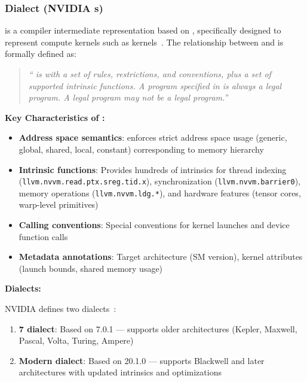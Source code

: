 \subsubsection{  Dialect (NVIDIA s)}

  is a compiler intermediate representation based on  , specifically designed to represent  compute kernels such as  kernels~\cite{nvvmirspec}. The relationship between   and   is formally defined as:

\begin{quote}
\textit{``  is   with a set of rules, restrictions, and conventions, plus a set of supported intrinsic functions. A program specified in   is always a legal  program. A legal  program may not be a legal  program.''}~\cite{nvvmirspec}
\end{quote}

\textbf{Key Characteristics of  :}

\begin{itemize}[noitemsep]
  \item \textbf{Address space semantics}:  enforces strict address space usage (generic, global, shared, local, constant) corresponding to  memory hierarchy
  \item \textbf{Intrinsic functions}: Provides hundreds of intrinsics for thread indexing (\texttt{llvm.nvvm.read.ptx.sreg.tid.x}), synchronization (\texttt{llvm.nvvm.barrier0}), memory operations (\texttt{llvm.nvvm.ldg.*}), and hardware features (tensor cores, warp-level primitives)
  \item \textbf{Calling conventions}: Special conventions for kernel launches and device function calls
  \item \textbf{Metadata annotations}: Target architecture (SM version), kernel attributes (launch bounds, shared memory usage)
\end{itemize}

\textbf{ Dialects:}

NVIDIA defines two   dialects~\cite{nvvmirspec}:

\begin{enumerate}[noitemsep]
  \item \textbf{ 7 dialect}: Based on  7.0.1 --- supports older  architectures (Kepler, Maxwell, Pascal, Volta, Turing, Ampere)
  \item \textbf{Modern dialect}: Based on  20.1.0 --- supports Blackwell and later architectures with updated intrinsics and optimizations
\end{enumerate}

